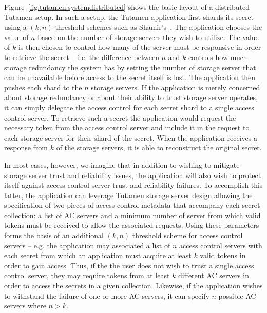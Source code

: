 Figure~\ref{fig:tutamen:systemdistributed} shows the basic layout of a
distributed Tutamen setup. In such a setup, the Tutamen application
first shards its secret using a $(k, n)$ threshold schemes such as
Shamir's~\cite{shamir1979}. The application chooses the value of $n$
based on the number of storage servers they wish to utilize. The value
of $k$ is then chosen to control how many of the server must be
responsive in order to retrieve the secret -- i.e. the difference
between $n$ and $k$ controls how much storage redundancy the system
has by setting the number of storage server that can be unavailable
before access to the secret itself is lost. The application then
pushes each shard to the $n$ storage servers. If the application is
merely concerned about storage redundancy or about their ability to
trust storage server operates, it can simply delegate the access
control for each secret shard to a single access control server. To
retrieve such a secret the application would request the necessary
token from the access control server and include it in the request to
each storage server for their shard of the secret. When the
application receives a response from $k$ of the storage servers, it is
able to reconstruct the original secret.

In most cases, however, we imagine that in addition to wishing to
mitigate storage server trust and reliability issues, the application
will also wish to protect itself against access control server trust
and reliability failures. To accomplish this latter, the application
can leverage Tutamen storage server design allowing the specification
of two pieces of access control metadata that accompany each secret
collection: a list of AC servers and a minimum number of server from
which valid tokens must be received to allow the associated
requests. Using these parameters forms the basis of an additional $(k,
n)$ threshold scheme for access control servers -- e.g. the
application may associated a list of $n$ access control servers with
each secret from which an application must acquire at least $k$ valid
tokens in order to gain access. Thus, if the the user does not wish to
trust a single access control server, they may require tokens from at
least $k$ different AC servers in order to access the secrets in a
given collection. Likewise, if the application wishes to withstand the
failure of one or more AC servers, it can specify $n$ possible AC
servers where $n > k$.

